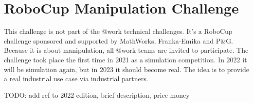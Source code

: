 \newpage
\section{RoboCup Manipulation Challenge}

This challenge is not part of the @work technical challenges. It's a RoboCup challenge sponsored and supported by MathWorks, Franka-Emika and P\&G. Because it is about manipulation, all @work teams are invited to participate. The challenge took place the first time in 2021 as a simulation competition. In 2022 it will be simulation again, but in 2023 it should become real. The idea is to provide a real industrial use case via industrial partners. 

TODO: add ref to 2022 edition, brief description, price money 